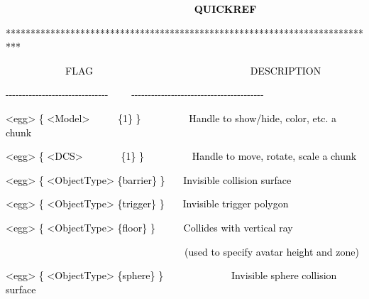 \documentclass[a4paper]{article}
\newcommand\textstyleOOoComputerKeyWord[1]{\textrm{\textcolor[rgb]{0.0,0.0,0.5019608}{#1}}}
\begin{document}
{\bfseries
\hypertarget{RefHeading7910869075401}{}\textstyleOOoComputerKeyWord{\textcolor{black}{\ \ \ \ \ \ \ \ \ \ \ \ \ \ \ \ \ \ \ \ \ \ \ \ \ \ \ \ \ \ \ \ \ QUICKREF}}}

{\color{black}
\textstyleOOoComputerKeyWord{\textcolor{black}{***************************************************************************}}}


\bigskip

{\color{black}
\textstyleOOoComputerKeyWord{\textcolor{black}{\ \ \ \ \ \ \ \ \ \ \ \ FLAG
\ \ \ \ \ \ \ \ \ \ \ \ \ \ \ \ \ \ \ \ \ \ \ \ \ \ \ \ \ \ \ DESCRIPTION}}}

{\color{black}
\textstyleOOoComputerKeyWord{\textcolor{black}{{}-{}-{}-{}-{}-{}-{}-{}-{}-{}-{}-{}-{}-{}-{}-{}-{}-{}-{}-{}-{}-{}-{}-{}-{}-{}-{}-{}-{}-{}-{}-
\ \ \ \ {}-{}-{}-{}-{}-{}-{}-{}-{}-{}-{}-{}-{}-{}-{}-{}-{}-{}-{}-{}-{}-{}-{}-{}-{}-{}-{}-{}-{}-{}-{}-{}-{}-{}-{}-{}-{}-{}-{}-{}-}}}


\bigskip

{\color{black}
\textstyleOOoComputerKeyWord{\textcolor{black}{{\textless}egg{\textgreater} \{ {\textless}Model{\textgreater}
\ \ \ \ \ \{1\} \} \ \ \ \ \ \ \ \ \ Handle to show/hide, color, etc. a chunk}}}

{\color{black}
\textstyleOOoComputerKeyWord{\textcolor{black}{{\textless}egg{\textgreater} \{ {\textless}DCS{\textgreater}
\ \ \ \ \ \ \ \{1\} \} \ \ \ \ \ \ \ \ \ Handle to move, rotate, scale a chunk}}}

{\color{black}
\textstyleOOoComputerKeyWord{\textcolor{black}{{\textless}egg{\textgreater} \{ {\textless}ObjectType{\textgreater}
\{barrier\} \} \ \ \ Invisible collision surface}}}

{\color{black}
\textstyleOOoComputerKeyWord{\textcolor{black}{{\textless}egg{\textgreater} \{ {\textless}ObjectType{\textgreater}
\{trigger\} \} \ \ \ Invisible trigger polygon}}}

{\color{black}
\textstyleOOoComputerKeyWord{\textcolor{black}{{\textless}egg{\textgreater} \{ {\textless}ObjectType{\textgreater}
\{floor\} \} \ \ \ \ \ Collides with vertical ray}}}

{\color{black}
\textstyleOOoComputerKeyWord{\textcolor{black}{\ \ \ \ \ \ \ \ \ \ \ \ \ \ \ \ \ \ \ \ \ \ \ \ \ \ \ \ \ \ \ \ \ \ \ \ (used
to specify avatar height and zone)}}}

{\color{black}
\textstyleOOoComputerKeyWord{\textcolor{black}{{\textless}egg{\textgreater} \{ {\textless}ObjectType{\textgreater}
\{sphere\} \} \ \ \ \ \ \ \ \ \ \ \ \ \ Invisible sphere collision surface}}}
\end{document}
